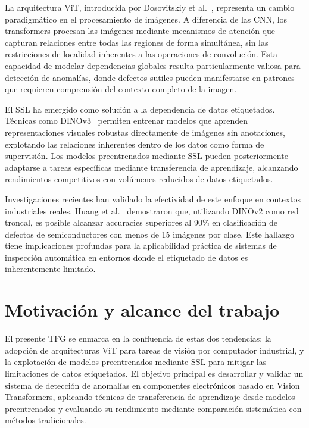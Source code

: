 La arquitectura \acrfull{ViT}, introducida por Dosovitskiy et al.~\cite{dosovitskiy2021vit}, representa un cambio paradigmático en el procesamiento de imágenes. A diferencia de las \acrshort{CNN}, los transformers procesan las imágenes mediante mecanismos de atención que capturan relaciones entre todas las regiones de forma simultánea, sin las restricciones de localidad inherentes a las operaciones de convolución. Esta capacidad de modelar dependencias globales resulta particularmente valiosa para detección de anomalías, donde defectos sutiles pueden manifestarse en patrones que requieren comprensión del contexto completo de la imagen.

El \acrfull{SSL} ha emergido como solución a la dependencia de datos etiquetados. Técnicas como DINOv3~\cite{simeoni2025dinov3} permiten entrenar modelos que aprenden representaciones visuales robustas directamente de imágenes sin anotaciones, explotando las relaciones inherentes dentro de los datos como forma de supervisión. Los modelos preentrenados mediante \acrshort{SSL} pueden posteriormente adaptarse a tareas específicas mediante transferencia de aprendizaje, alcanzando rendimientos competitivos con volúmenes reducidos de datos etiquetados.

Investigaciones recientes han validado la efectividad de este enfoque en contextos industriales reales. Huang et al.~\cite{huang2025semiconductor} demostraron que, utilizando DINOv2 como red troncal, es posible alcanzar accuracies superiores al 90\% en clasificación de defectos de semiconductores con menos de 15 imágenes por clase. Este hallazgo tiene implicaciones profundas para la aplicabilidad práctica de sistemas de inspección automática en entornos donde el etiquetado de datos es inherentemente limitado.


\section{Motivación y alcance del trabajo}
\label{sec:motivacion}

El presente \gls{TFG} se enmarca en la confluencia de estas dos tendencias: la adopción de arquitecturas \acrshort{ViT} para tareas de visión por computador industrial, y la explotación de modelos preentrenados mediante \acrshort{SSL} para mitigar las limitaciones de datos etiquetados. El objetivo principal es desarrollar y validar un sistema de detección de anomalías en componentes electrónicos basado en Vision Transformers, aplicando técnicas de transferencia de aprendizaje desde modelos preentrenados y evaluando su rendimiento mediante comparación sistemática con métodos tradicionales.

